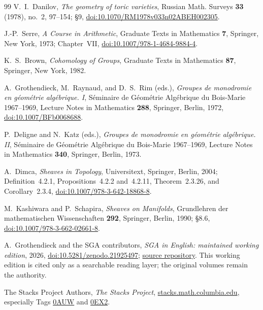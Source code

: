 \begin{thebibliography}{99}
V.~I.~Danilov,
\emph{The geometry of toric varieties},
Russian Math. Surveys \textbf{33} (1978), no.~2, 97--154; \S9,
\href{https://doi.org/10.1070/RM1978v033n02ABEH002305}{doi:10.1070/RM1978v033n02ABEH002305}.

J.-P.~Serre,
\emph{A Course in Arithmetic},
Graduate Texts in Mathematics \textbf{7}, Springer, New York, 1973;
Chapter~VII,
\href{https://doi.org/10.1007/978-1-4684-9884-4}{doi:10.1007/978-1-4684-9884-4}.

K.~S.~Brown,
\emph{Cohomology of Groups},
Graduate Texts in Mathematics \textbf{87}, Springer, New York, 1982.

A.~Grothendieck, M.~Raynaud, and D.~S.~Rim (eds.),
\emph{Groupes de monodromie en g\'eom\'etrie alg\'ebrique. I},
S\'eminaire de G\'eom\'etrie Alg\'ebrique du Bois-Marie 1967--1969,
Lecture Notes in Mathematics \textbf{288}, Springer, Berlin, 1972,
\href{https://doi.org/10.1007/BFb0068688}{doi:10.1007/BFb0068688}.

P.~Deligne and N.~Katz (eds.),
\emph{Groupes de monodromie en g\'eom\'etrie alg\'ebrique. II},
S\'eminaire de G\'eom\'etrie Alg\'ebrique du Bois-Marie 1967--1969,
Lecture Notes in Mathematics \textbf{340}, Springer, Berlin, 1973.

A.~Dimca,
\emph{Sheaves in Topology},
Universitext, Springer, Berlin, 2004; Definition~4.2.1,
Propositions~4.2.2 and~4.2.11, Theorem~2.3.26, and Corollary~2.3.4,
\href{https://doi.org/10.1007/978-3-642-18868-8}{doi:10.1007/978-3-642-18868-8}.

M.~Kashiwara and P.~Schapira,
\emph{Sheaves on Manifolds},
Grundlehren der mathematischen Wissenschaften \textbf{292}, Springer,
Berlin, 1990; \S8.6,
\href{https://doi.org/10.1007/978-3-662-02661-8}{doi:10.1007/978-3-662-02661-8}.

A.~Grothendieck and the SGA contributors,
\emph{SGA in English: maintained working edition}, 2026,
\href{https://doi.org/10.5281/zenodo.21925497}{doi:10.5281/zenodo.21925497};
\href{https://github.com/KokunoYumeto/sga-en}{source repository}.
This working edition is cited only as a searchable reading layer; the
original volumes remain the authority.

The Stacks Project Authors,
\emph{The Stacks Project},
\href{https://stacks.math.columbia.edu}{stacks.math.columbia.edu},
especially Tags
\href{https://stacks.math.columbia.edu/tag/0AUW}{0AUW} and
\href{https://stacks.math.columbia.edu/tag/0EX2}{0EX2}.

\end{thebibliography}
